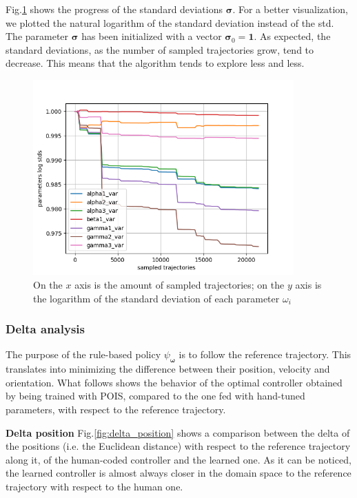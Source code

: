 Fig.\ref{fig:log_stds} shows the progress of the standard deviations $\boldsymbol \sigma$. For a better visualization, we plotted the natural logarithm of the standard deviation instead of the std.
The parameter $\boldsymbol \sigma$ has been initialized with a vector $\boldsymbol \sigma_0= \boldsymbol 1.$ As expected, the standard deviations, as the number of sampled trajectories grow, tend to decrease. This means that the algorithm tends to explore less and less.


\begin{figure}[H]
 \centering
  \captionsetup{width=10cm}
  \includegraphics[width=10cm]{./img/parameters/log_stds}
  \caption{On the $x$ axis is the amount of sampled trajectories; on the $y$ axis is the logarithm of the standard deviation of each parameter $\omega_i$}
   \label{fig:log_stds}
\end{figure}



\subsubsection{Delta analysis}

The purpose of the rule-based policy $\psi_{\boldsymbol \omega}$ is to follow the reference trajectory. This translates into minimizing the difference between their position, velocity and orientation.
What follows shows the behavior of the optimal controller obtained by being trained with POIS, compared to the one fed with hand-tuned parameters, with respect to the reference trajectory.

\textbf{Delta position}
\label{sec:deltarho}
Fig.\ref{fig:delta_position} shows a comparison between the delta of the positions (i.e. the Euclidean distance) with respect to the reference trajectory along it, of the human-coded controller and the learned one.
As it can be noticed, the learned controller is almost always closer in the domain space to the reference trajectory with respect to the human one.

